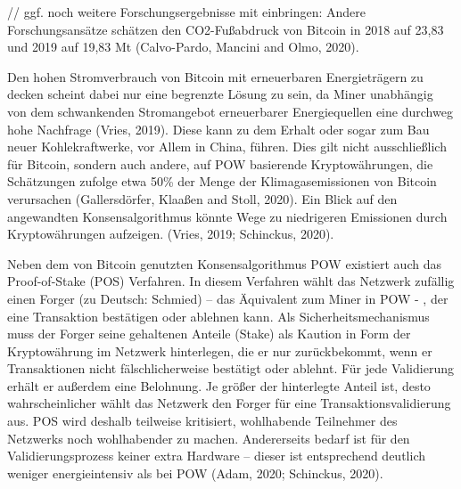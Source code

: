 // ggf. noch weitere Forschungsergebnisse mit einbringen: Andere Forschungsansätze schätzen den CO2-Fußabdruck von Bitcoin in 2018 auf 23,83 und 2019 auf 19,83 Mt (Calvo-Pardo, Mancini and Olmo, 2020).
\newline

Den hohen Stromverbrauch von Bitcoin mit erneuerbaren Energieträgern zu decken scheint dabei nur eine begrenzte Lösung zu sein, da Miner unabhängig von dem schwankenden Stromangebot erneuerbarer Energiequellen eine durchweg hohe Nachfrage (Vries, 2019). Diese kann zu dem Erhalt oder sogar zum Bau neuer Kohlekraftwerke, vor Allem in China, führen. Dies gilt nicht ausschließlich für Bitcoin, sondern auch andere, auf POW basierende Kryptowährungen, die Schätzungen zufolge etwa 50\% der Menge der Klimagasemissionen von Bitcoin verursachen (Gallersdörfer, Klaaßen and Stoll, 2020). Ein Blick auf den angewandten Konsensalgorithmus könnte Wege zu niedrigeren Emissionen durch Kryptowährungen aufzeigen. (Vries, 2019; Schinckus, 2020).
\newline

Neben dem von Bitcoin genutzten Konsensalgorithmus POW existiert auch das Proof-of-Stake (POS) Verfahren. In diesem Verfahren wählt das Netzwerk zufällig einen Forger (zu Deutsch: Schmied) – das Äquivalent zum Miner in POW - , der eine Transaktion bestätigen oder ablehnen kann. Als Sicherheitsmechanismus muss der Forger seine gehaltenen Anteile (Stake) als Kaution in Form der Kryptowährung im Netzwerk hinterlegen, die er nur zurückbekommt, wenn er Transaktionen nicht fälschlicherweise bestätigt oder ablehnt. Für jede Validierung erhält er außerdem eine Belohnung. Je größer der hinterlegte Anteil ist, desto wahrscheinlicher wählt das Netzwerk den Forger für eine Transaktionsvalidierung aus. POS wird deshalb teilweise kritisiert, wohlhabende Teilnehmer des Netzwerks noch wohlhabender zu machen. Andererseits bedarf ist für den Validierungsprozess keiner extra Hardware – dieser ist entsprechend deutlich weniger energieintensiv als bei POW (Adam, 2020; Schinckus, 2020). 
